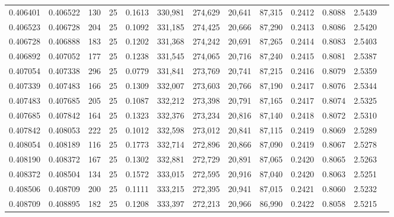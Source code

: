 \begin{tabular}{rrrrrrrrrrrrr}
0.406401 & 0.406522 &   130 &  25 &                                     0.1613 & 330,981 & 274,629 &  20,641 &  87,315 & 0.2412 & 0.8088 & 2.5439 \\
0.406523 & 0.406728 &   204 &  25 &                                     0.1092 & 331,185 & 274,425 &  20,666 &  87,290 & 0.2413 & 0.8086 & 2.5420 \\
0.406728 & 0.406888 &   183 &  25 &                                     0.1202 & 331,368 & 274,242 &  20,691 &  87,265 & 0.2414 & 0.8083 & 2.5403 \\
0.406892 & 0.407052 &   177 &  25 &                                     0.1238 & 331,545 & 274,065 &  20,716 &  87,240 & 0.2415 & 0.8081 & 2.5387 \\
0.407054 & 0.407338 &   296 &  25 &                                     0.0779 & 331,841 & 273,769 &  20,741 &  87,215 & 0.2416 & 0.8079 & 2.5359 \\
0.407339 & 0.407483 &   166 &  25 &                                     0.1309 & 332,007 & 273,603 &  20,766 &  87,190 & 0.2417 & 0.8076 & 2.5344 \\
0.407483 & 0.407685 &   205 &  25 &                                     0.1087 & 332,212 & 273,398 &  20,791 &  87,165 & 0.2417 & 0.8074 & 2.5325 \\
0.407685 & 0.407842 &   164 &  25 &                                     0.1323 & 332,376 & 273,234 &  20,816 &  87,140 & 0.2418 & 0.8072 & 2.5310 \\
0.407842 & 0.408053 &   222 &  25 &                                     0.1012 & 332,598 & 273,012 &  20,841 &  87,115 & 0.2419 & 0.8069 & 2.5289 \\
0.408054 & 0.408189 &   116 &  25 &                                     0.1773 & 332,714 & 272,896 &  20,866 &  87,090 & 0.2419 & 0.8067 & 2.5278 \\
0.408190 & 0.408372 &   167 &  25 &                                     0.1302 & 332,881 & 272,729 &  20,891 &  87,065 & 0.2420 & 0.8065 & 2.5263 \\
0.408372 & 0.408504 &   134 &  25 &                                     0.1572 & 333,015 & 272,595 &  20,916 &  87,040 & 0.2420 & 0.8063 & 2.5251 \\
0.408506 & 0.408709 &   200 &  25 &                                     0.1111 & 333,215 & 272,395 &  20,941 &  87,015 & 0.2421 & 0.8060 & 2.5232 \\
0.408709 & 0.408895 &   182 &  25 &                                     0.1208 & 333,397 & 272,213 &  20,966 &  86,990 & 0.2422 & 0.8058 & 2.5215 \\

\end{tabular}

